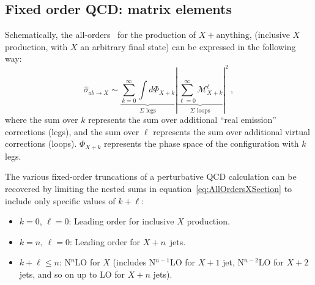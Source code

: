 \subsection{Fixed order QCD: matrix elements}
Schematically, the all-orders \xsec\ for the production of $X + \mathrm{anything}$, (inclusive $X$ production, with $X$ an arbitrary final state) can be expressed in the following way:
\begin{equation}
\hat{\sigma}_{ab\rightarrow X} \sim \underbrace{\sum_{k=0}^{\infty}{\int{d\Phi_{X+k}}}}_{\Sigma\text{ legs}}
                                          |\underbrace{\sum_{\ell=0}^{\infty}{\mathcal{M}^{\ell}_{X+k}} }_{\Sigma \text{ loops}}|^2~,
\label{eq:AllOrdersXSection}
\end{equation}
where the sum over $k$ represents the sum over additional ``real emission'' corrections (legs), and the sum over $\ell$ represents the sum over additional virtual corrections (loops).
$\Phi_{X+k}$ represents the phase space of the configuration with $k$ legs.

The various fixed-order truncations of a perturbative QCD calculation can be recovered by limiting the nested sums in equation~\ref{eq:AllOrdersXSection} to include only specific values of $k+\ell$:

\begin{itemize}
\item $k=0$, $\ell=0$: Leading order for inclusive $X$ production.
\item $k=n$, $\ell=0$: Leading order for $X+n$~jets.
\item $k+\ell \leq n$: N$^n$LO for $X$ (includes N$^{n-1}$LO for $X+1$ jet,  N$^{n-2}$LO for $X+2$ jets, and so on up to LO for $X+n$ jets).
\end{itemize}

